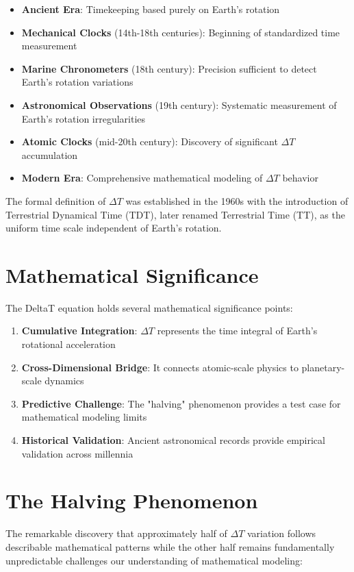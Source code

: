 \documentclass[12pt,a4paper]{report}
\begin{document}
\begin{itemize}
\item \textbf{Ancient Era}: Timekeeping based purely on Earth's rotation
\item \textbf{Mechanical Clocks} (14th-18th centuries): Beginning of standardized time measurement
\item \textbf{Marine Chronometers} (18th century): Precision sufficient to detect Earth's rotation variations
\item \textbf{Astronomical Observations} (19th century): Systematic measurement of Earth's rotation irregularities
\item \textbf{Atomic Clocks} (mid-20th century): Discovery of significant $\Delta T$ accumulation
\item \textbf{Modern Era}: Comprehensive mathematical modeling of $\Delta T$ behavior
\end{itemize}

The formal definition of $\Delta T$ was established in the 1960s with the introduction of Terrestrial Dynamical Time (TDT), later renamed Terrestrial Time (TT), as the uniform time scale independent of Earth's rotation.

\section{Mathematical Significance}

The DeltaT equation holds several mathematical significance points:

\begin{enumerate}
\item \textbf{Cumulative Integration}: $\Delta T$ represents the time integral of Earth's rotational acceleration
\item \textbf{Cross-Dimensional Bridge}: It connects atomic-scale physics to planetary-scale dynamics
\item \textbf{Predictive Challenge}: The "halving" phenomenon provides a test case for mathematical modeling limits
\item \textbf{Historical Validation}: Ancient astronomical records provide empirical validation across millennia
\end{enumerate}

\section{The Halving Phenomenon}

The remarkable discovery that approximately half of $\Delta T$ variation follows describable mathematical patterns while the other half remains fundamentally unpredictable challenges our understanding of mathematical modeling:
\end{document}
